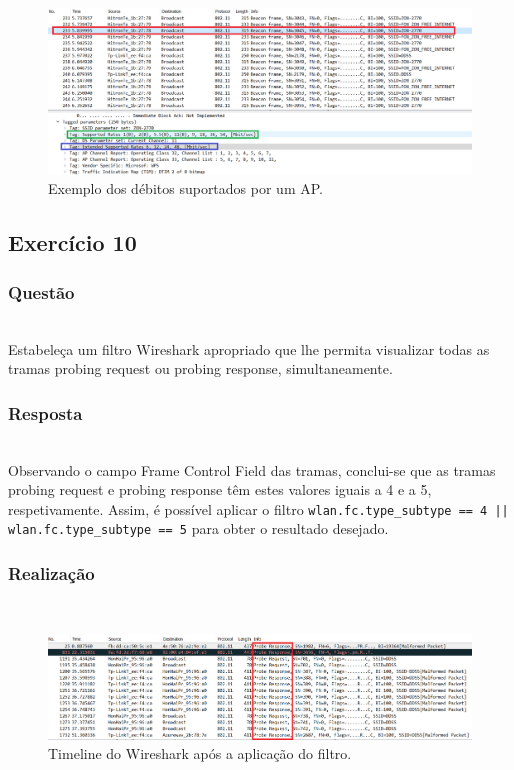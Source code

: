 \documentclass{llncs}
\begin{document}
\begin{figure}
  \begin{center}
  \includegraphics[scale=0.35]{imagens/beacon_rates.png} 
  \end{center}
  \caption{Exemplo dos débitos suportados por um AP.}
  \label{fig:beacon_rates}
\end{figure}


\clearpage
\subsection{Exercício 10}
\subsubsection{Questão}\rule[-10pt]{0pt}{10pt}\\

Estabeleça um filtro Wireshark apropriado que lhe permita visualizar todas as tramas probing request ou probing response, simultaneamente.

\subsubsection{Resposta}\rule[-10pt]{0pt}{10pt}\\

Observando o campo Frame Control Field das tramas, conclui-se que as tramas probing request e probing response têm estes valores iguais a 4 e a 5, respetivamente. Assim, é possível aplicar o filtro \texttt{wlan.fc.type_subtype == 4 || wlan.fc.type_subtype == 5} para obter o resultado desejado.

\subsubsection{Realização}\rule[-10pt]{0pt}{10pt}\\

\begin{figure}
  \begin{center}
  \includegraphics[scale=0.35]{imagens/probe_filter.png} 
  \end{center}
  \caption{Timeline do Wireshark após a aplicação do filtro.}
  \label{fig:probe_filter}
\end{figure}
\end{document}
